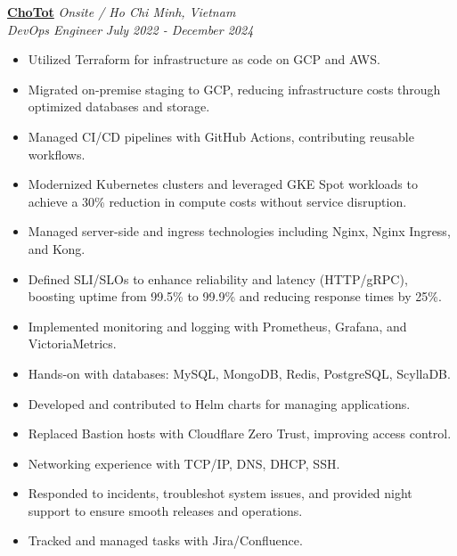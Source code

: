 \documentclass[11pt, a4paper]{article}
\begin{document}
\vspace{0.5em}
{\large\textbf{\href{https://www.chotot.com/}{ChoTot}}} \hfill {\small\textit{Onsite / Ho Chi Minh, Vietnam}} \\
\textit{DevOps Engineer} \hfill {\small\textit{July 2022 - December 2024}}
\begin{itemize}[leftmargin=*]
    \item Utilized Terraform for infrastructure as code on GCP and AWS.
    \item Migrated on-premise staging to GCP, reducing infrastructure costs through optimized databases and storage.
    \item Managed CI/CD pipelines with GitHub Actions, contributing reusable workflows.
    \item Modernized Kubernetes clusters and leveraged GKE Spot workloads to achieve a 30\% reduction in compute costs without service disruption.
    \item Managed server-side and ingress technologies including Nginx, Nginx Ingress, and Kong.
    \item Defined SLI/SLOs to enhance reliability and latency (HTTP/gRPC), boosting uptime from 99.5\% to 99.9\% and reducing response times by 25\%.
    \item Implemented monitoring and logging with Prometheus, Grafana, and VictoriaMetrics.
    \item Hands-on with databases: MySQL, MongoDB, Redis, PostgreSQL, ScyllaDB.
    \item Developed and contributed to Helm charts for managing applications.
    \item Replaced Bastion hosts with Cloudflare Zero Trust, improving access control.
    \item Networking experience with TCP/IP, DNS, DHCP, SSH.
    \item Responded to incidents, troubleshot system issues, and provided night support to ensure smooth releases and operations.
    \item Tracked and managed tasks with Jira/Confluence.
\end{itemize}
\end{document}
